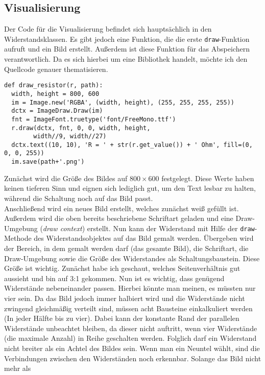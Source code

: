 \documentclass[a4paper,10pt,ngerman]{scrartcl}
\begin{document}
\subsection{Visualisierung}
Der Code f\"ur die Visualisierung befindet sich haupts\"achlich in den
Widerstandsklassen. Es gibt jedoch eine Funktion, die die erste 
\texttt{draw}-Funktion aufruft und ein Bild erstellt. Au\ss erdem ist diese
Funktion f\"ur das Abspeichern verantwortlich. Da es sich hierbei um eine
Bibliothek handelt, m\"ochte ich den Quellcode genauer thematisieren.
\lstset{language=Python}
\begin{lstlisting}
def draw_resistor(r, path):
  width, height = 800, 600
  im = Image.new('RGBA', (width, height), (255, 255, 255, 255))
  dctx = ImageDraw.Draw(im)
  fnt = ImageFont.truetype('font/FreeMono.ttf')
  r.draw(dctx, fnt, 0, 0, width, height,
        width//9, width//27)
  dctx.text((10, 10), 'R = ' + str(r.get_value()) + ' Ohm', fill=(0, 0, 0, 255))
  im.save(path+'.png')
\end{lstlisting}
Zun\"achst wird die Gr\"o\ss e des Bildes auf $800\times 600$ festgelegt. Diese
Werte haben keinen tieferen Sinn und eignen sich lediglich gut, um den Text lesbar
zu halten, w\"ahrend die Schaltung noch auf das Bild passt.\\
\indent Anschlie\ss end wird ein neues Bild erstellt, welches zun\"achst wei\ss 
gef\"ullt ist. Au\ss erdem wird die oben bereits beschriebene Schriftart geladen
und eine Draw-Umgebung (\emph{draw context}) erstellt. Nun kann der Widerstand mit Hilfe der
\texttt{draw}-Methode des Widerstandsobjektes auf das Bild gemalt werden.
\"Ubergeben wird der Bereich, in dem gemalt werden darf (das gesamte Bild),
die Schriftart, die Draw-Umgebung sowie die Gr\"o\ss e des Widerstandes als
Schaltungsbaustein. Diese Gr\"o\ss e ist wichtig. Zun\"achst habe ich 
geschaut, welches Seitenverh\"altnis gut aussieht und bin auf 3:1 gekommen. 
Nun ist es wichtig, dass gen\"ugend Widerst\"ande nebeneinander passen.
Hierbei k\"onnte man meinen, es m\"ussten nur vier sein. Da das Bild jedoch immer
halbiert wird und die Widerst\"ande nicht zwingend gleichm\"a\ss ig verteilt sind,
m\"ussen acht Bausteine einkalkuliert werden (In jeder H\"alfte bis zu vier).
Dabei kann der konstante Rand der parallelen Widerst\"ande unbeachtet bleiben,
da dieser nicht auftritt, wenn vier Widerst\"ande (die maximale Anzahl) in
Reihe geschalten werden. Folglich darf ein Widerstand nicht breiter als ein
Achtel des Bildes sein. Wenn man ein Neuntel w\"ahlt, sind die Verbindungen
zwischen den Widerst\"anden noch erkennbar. Solange das Bild nicht mehr als
\end{document}
